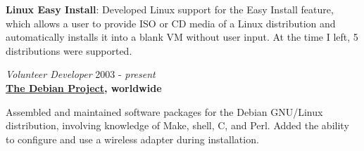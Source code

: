 \documentclass[overlapped,line,margin]{res}
\begin{document}
\begin{resume}
  \textbf{Linux Easy Install}: Developed Linux support for the Easy
  Install feature, which allows a user to provide ISO or CD media of
  a Linux distribution and automatically installs it into a blank VM
  without user input. At the time I left, 5 distributions were supported.

\textit{Volunteer Developer} \hfill 2003 - \textit{present} \\
\textbf{\href{https://www.debian.org}{The Debian Project}, worldwide}

  Assembled and maintained software packages for the Debian GNU/Linux
  distribution, involving knowledge of Make, shell, C, and Perl. Added
  the ability to configure and use a wireless adapter during installation.

\end{resume}
\end{document}

